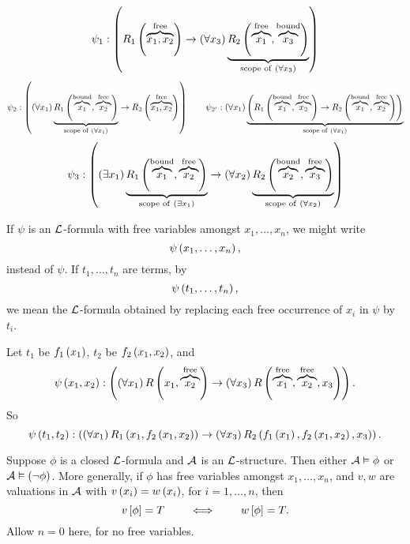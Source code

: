 \begin{example*}
$$ \psi_1 : \impb{R_1\rb{\overbrace{x_1, x_2}^{\text{free}}}}{\fab{x_3}\underbrace{R_2\rb{\overbrace{x_1}^{\text{free}}, \overbrace{x_3}^{\text{bound}}}}_{\text{scope of} \ \fab{x_3}}} $$
$$ \psi_2 : \impb{\fab{x_1}\underbrace{R_1\rb{\overbrace{x_1}^{\text{bound}}, \overbrace{x_2}^{\text{free}}}}_{\text{scope of} \ \fab{x_1}}}{R_2\rb{\overbrace{x_1, x_2}^{\text{free}}}} \qquad \psi_{2'} : \fab{x_1}\underbrace{\impb{R_1\rb{\overbrace{x_1}^{\text{bound}}, \overbrace{x_2}^{\text{free}}}}{R_2\rb{\overbrace{x_1}^{\text{bound}}, \overbrace{x_2}^{\text{free}}}}}_{\text{scope of} \ \fab{x_1}} $$
$$ \psi_3 : \impb{\teb{x_1}\underbrace{R_1\rb{\overbrace{x_1}^{\text{bound}}, \overbrace{x_2}^{\text{free}}}}_{\text{scope of} \ \teb{x_1}}}{\fab{x_2}\underbrace{R_2\rb{\overbrace{x_2}^{\text{bound}}, \overbrace{x_3}^{\text{free}}}}_{\text{scope of} \ \fab{x_2}}} $$
\end{example*}

\begin{definition}
If $ \psi $ is an $ \LL $-formula with free variables amongst $ x_1, \dots, x_n $, we might write
$$ \psi\rb{x_1, \dots, x_n}, $$
instead of $ \psi $. If $ t_1, \dots, t_n $ are terms, by
$$ \psi\rb{t_1, \dots, t_n}, $$
we mean the $ \LL $-formula obtained by replacing each free occurrence of $ x_i $ in $ \psi $ by $ t_i $.
\end{definition}

\begin{example*}
Let $ t_1 $ be $ f_1\rb{x_1} $, $ t_2 $ be $ f_2\rb{x_1, x_2} $, and
$$ \psi\rb{x_1, x_2} : \impb{\fab{x_1}R\rb{x_1, \overbrace{x_2}^{\text{free}}}}{\fab{x_3}R\rb{\overbrace{x_1}^{\text{free}}, \overbrace{x_2}^{\text{free}}, x_3}}. $$
So
$$ \psi\rb{t_1, t_2} : \impb{\fab{x_1}R_1\rb{x_1, f_2\rb{x_1, x_2}}}{\fab{x_3}R_2\rb{f_1\rb{x_1}, f_2\rb{x_1, x_2}, x_3}}. $$
\end{example*}

\pagebreak

\begin{theorem}
\label{thm:2.3.3}
Suppose $ \phi $ is a closed $ \LL $-formula and $ \AA $ is an $ \LL $-structure. Then either $ \AA \vDash \phi $ or $ \AA \vDash \notb{\phi} $. More generally, if $ \phi $ has free variables amongst $ x_1, \dots, x_n $, and $ v, w $ are valuations in $ \AA $ with $ v\rb{x_i} = w\rb{x_i} $, for $ i = 1, \dots, n $, then
$$ v\sb{\phi} = T \qquad \iff \qquad w\sb{\phi} = T. $$
Allow $ n = 0 $ here, for no free variables.
\end{theorem}

